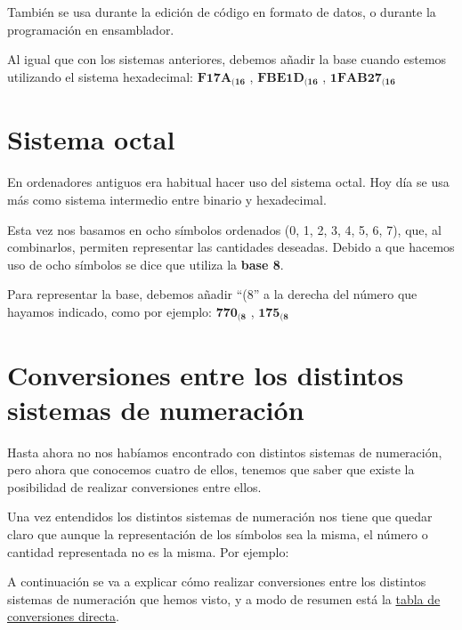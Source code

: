 También se usa durante la edición de código en formato de datos, o durante la programación en ensamblador.

Al igual que con los sistemas anteriores, debemos añadir la base cuando estemos utilizando el sistema hexadecimal: $\mathbf{ F17A_{(16}} $ , $\mathbf{ FBE1D_{(16}} $ , $\mathbf{ 1FAB27_{(16}} $


\section{Sistema octal}
En ordenadores antiguos era habitual hacer uso del sistema octal. Hoy día se usa más como sistema intermedio entre binario y hexadecimal.

Esta vez nos basamos en ocho símbolos ordenados (0, 1, 2, 3, 4, 5, 6, 7), que, al combinarlos, permiten representar las cantidades deseadas. Debido a que hacemos uso de ocho símbolos se dice que utiliza la \textbf{base 8}.

Para representar la base, debemos añadir “(8” a la derecha del número que hayamos indicado, como por ejemplo: $\mathbf{ 770_{(8} }$ , $\mathbf{ 175_{(8}} $


\section{Conversiones entre los distintos sistemas de numeración}

Hasta ahora no nos habíamos encontrado con distintos sistemas de numeración, pero ahora que conocemos cuatro de ellos, tenemos que saber que existe la posibilidad de realizar conversiones entre ellos.


Una vez entendidos los distintos sistemas de numeración nos tiene que quedar claro que aunque la representación de los símbolos sea la misma, el número o cantidad representada no es la misma. Por ejemplo:


A continuación se va a explicar cómo realizar conversiones entre los distintos sistemas de numeración que hemos visto, y a modo de resumen está la \hyperlink{tabla_conversiones_directas}{tabla de conversiones directa}.

